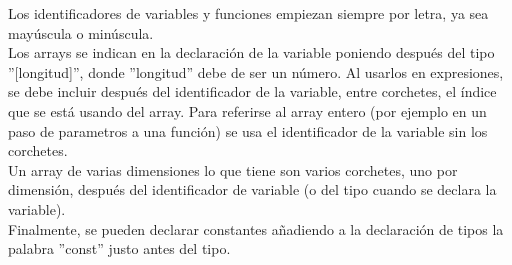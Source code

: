 \documentclass[a4paper, 12pt]{article}
\begin{document}
Los identificadores de variables y funciones empiezan siempre por letra, ya sea mayúscula o minúscula.\\

Los arrays se indican en la declaración de la variable poniendo después del tipo ''[longitud]'', donde ''longitud'' debe de ser un número. Al usarlos en expresiones, se debe incluir después del identificador de la variable, entre corchetes, el índice que se está usando del array. Para referirse al array entero (por ejemplo en un paso de parametros a una función) se usa el identificador de la variable sin los corchetes.\\

Un array de varias dimensiones lo que tiene son varios corchetes, uno por dimensión, después del identificador de variable (o del tipo cuando se declara la variable).\\
Finalmente, se pueden declarar constantes añadiendo a la declaración de tipos la palabra ''const'' justo antes del tipo.
\end{document}
